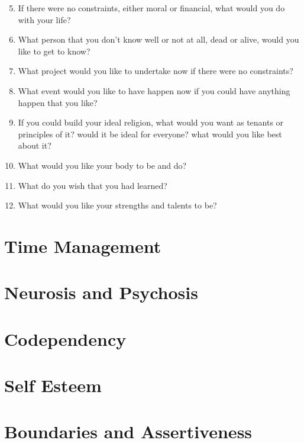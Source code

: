\begin{enumerate}
\setcounter{enumi}{4}
	\item If there were no constraints, either moral or financial, what would
 you do with your life?

	\item What person that you don't know well or not at all, dead or alive,
 would you like to get to know?

	\item What project would you like to undertake now if there were no
 constraints?

	\item What event would you like to have happen now if you could have
 anything happen that you like?

	\item If you could build your ideal religion, what would you want as tenants
 or principles of it? would it be ideal for everyone? what would you
 like best about it?

	\item What would you like your body to be and do?

	\item What do you wish that you had learned?

	\item What would you like your strengths and talents to be?
\end{enumerate}

\section{Time Management}

\section{Neurosis and Psychosis}

\section{Codependency}

\section{Self Esteem}

\section{Boundaries and Assertiveness}

